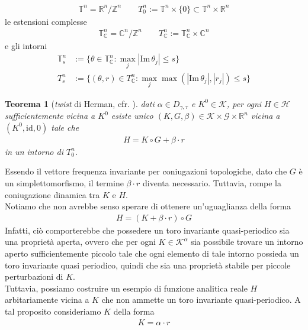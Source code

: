 \documentclass[twoside, 11pt]{amsbook}
\newcommand{\0}{{(0)}}
\newcommand{\3}{{(3)}}
\theoremstyle{colonplain}
\newtheorem{thm}{Teorema}[chapter]
\theoremstyle{colondefinition}
\theoremstyle{colonremark}
\numberwithin{equation}{chapter}
\begin{document}
\begin{align}
    \mathbb{T}^n = \mathbb{R}^n/\mathbb{Z}^n \qquad T^n_0 := \mathbb{T}^n \times \{0\} \subset \mathbb{T}^n \times \mathbb{R}^n
\end{align}
le estensioni complesse
\begin{align}
    \mathbb{T}^n_\mathbb{C} = \mathbb{C}^n/\mathbb{Z}^n \qquad T^n_{\mathbb{C}} := \mathbb{T}^n_\mathbb{C} \times \mathbb{C}^n
\end{align}
e gli intorni
\begin{align}
    \mathbb{T}^n_s &:= \{\theta \in \mathbb{T}^n_\mathbb{C} : \max_j |\mathrm{Im} \, \theta_j| \leq s\} \\
    T^n_s &:= \{ (\theta, r) \in T^n_\mathbb{C} : \max_j \max(|\mathrm{Im} \, \theta_j|, |r_j|) \leq s\}
\end{align}
\begin{thm}[\textit{twist} di Herman, cfr. \cite{Fejoz02}]\label{TwistThmHerman1} dati $\alpha \in D_{\gamma, \tau}$ e $K^0 \in \mathcal{K}$, per ogni $H \in \mathcal{H}$ sufficientemente vicina a $K^0$ esiste unico $(K, G, \beta) \in \mathcal{K} \times \mathcal{G} \times \mathbb{R}^n$ vicina a $(K^0, \mathrm{id}, 0)$ tale che
\begin{align}\label{TwistNormalForm}
    H = K \circ G + \beta \cdot r 
\end{align}
in un intorno di $T^n_0$.
\end{thm}
Essendo il vettore frequenza invariante per coniugazioni topologiche, dato che $G$ è un simplettomorfismo, il termine $\beta \cdot r$ diventa necessario. Tuttavia, rompe la coniugazione dinamica tra $K$ e $H$. \\
Notiamo che non avrebbe senso sperare di ottenere un'uguaglianza della forma
\begin{align}
    H = (K + \beta \cdot r) \circ G
\end{align}
Infatti, ciò comporterebbe che possedere un toro invariante quasi-periodico sia una proprietà aperta, ovvero che per ogni $K \in \mathcal{K}^\alpha$ sia possibile trovare un intorno aperto sufficientemente piccolo tale che ogni elemento di tale intorno possieda un toro invariante quasi periodico, quindi che sia una proprietà stabile per piccole perturbazioni di $K$. \\
Tuttavia, possiamo costruire un esempio di funzione analitica reale $H$ arbitariamente vicina a $K$ che non ammette un toro invariante quasi-periodico. A tal proposito consideriamo $K$ della forma
\begin{align}
    K = \alpha \cdot r
\end{align}
\end{document}
